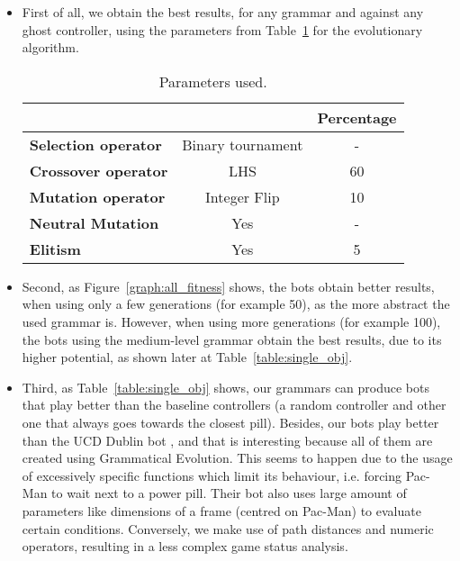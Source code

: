 \begin{itemize}
\item First of all, we obtain the best results, for any grammar and against any ghost controller, using the parameters from Table~\ref{table:best-params-en} for the evolutionary algorithm.

\begin{table}[h]
\centering
\begin{tabular}{lc|c|}
\cline{3-3}
                                                   &                                                               & \textbf{Percentage} \\ \hline
\multicolumn{1}{|l|}{\textbf{Selection operator}} & Binary tournament \footnotemark & -                   \\ \hline
\multicolumn{1}{|l|}{\textbf{Crossover operator}}     & LHS                                                           & 60                  \\ \hline
\multicolumn{1}{|l|}{\textbf{Mutation operator}}  & Integer Flip                                                  & 10                  \\ \hline
\multicolumn{1}{|l|}{\textbf{Neutral Mutation}}    & Yes                                                            & -                   \\ \hline
\multicolumn{1}{|l|}{\textbf{Elitism}}            & Yes                                                            & 5                   \\ \hline
\end{tabular}
\label{table:best-params-en}
\caption{Parameters used.}
\end{table}

\item Second, as Figure~\ref{graph:all_fitness} shows, the bots obtain better results, when using only a few generations (for example 50), as the more abstract the used grammar is. However, when using more generations (for example 100), the bots using the medium-level grammar obtain the best results, due to its higher potential, as shown later at Table~\ref{table:single_obj}.

\item Third, as Table~\ref{table:single_obj} shows, our grammars can produce bots that play better than the baseline controllers (a random controller and other one that always goes towards the closest pill). Besides, our bots play better than the UCD Dublin bot \cite{galvan2010evolving}, and that is interesting because all of them are created using Grammatical Evolution. This seems to happen due to the usage of excessively specific functions which limit its behaviour, i.e. forcing Pac-Man to wait next to a power pill. Their bot also uses large amount of parameters like dimensions of a frame (centred on Pac-Man) to evaluate certain conditions. Conversely, we make use of path distances and numeric operators, resulting in a less complex game status analysis.
\end{itemize}

